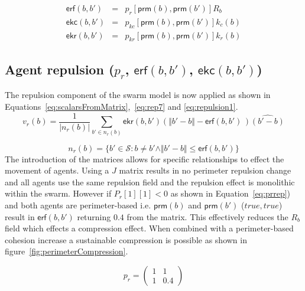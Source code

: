 \documentclass[12pt,a4paper]{IEEEtran}
\newcommand{\magn}[1]{\Vert{#1}\Vert}
\newcommand{\card}[1]{\vert{#1}\vert}
\newcommand{\vbb}[2]{#2-#1}
\begin{document}
\begin{equation}\label{eq:scalarsFromMatrix}
\begin{array}{rcl}
\mathsf{erf}(b, b') &=&  p_r[\mathsf{prm}(b), \mathsf{prm}(b')] R_b\\
\mathsf{ekc}(b, b') &=&  p_{kc}[\mathsf{prm}(b), \mathsf{prm}(b')] k_c(b) \\
\mathsf{ekr}(b, b') &=&  p_{kr}[\mathsf{prm}(b), \mathsf{prm}(b')] k_r(b)
\end{array}
\end{equation}

\subsection{Agent repulsion ($p_r$, $\mathsf{erf}(b,b')$, $\mathsf{ekc}(b,b')$)}

The repulsion component of the swarm model is now applied as shown in Equations~\ref{eq:scalarsFromMatrix},~\ref{eq:rep7} and \ref{eq:repulsion1}.
\small
\begin{equation}\label{eq:rep7}
	v_r(b) = \frac{1}{\card{n_r(b)}}\sum_{b' \in n_r(b)} \mathsf{ekr}(b,b') \left(\magn{\vbb{b}{b'}} - \mathsf{erf}\left(b,b'\right) \, \right) \widehat{\left(\vbb{b}{b'}\right)}
\end{equation}

\begin{equation}\label{eq:repulsion1}
n_r(b) = \{b' \in \mathcal{S} : b \neq b' \land \magn{\vbb{b}{b'}} \leq \mathsf{erf}(b,b')\}
\end{equation}
\normalsize
The introduction of the matrices allows for specific relationships to effect the movement of agents. Using a $J$ matrix results in no perimeter repulsion change and all agents use the same repulsion field and the repulsion effect is monolithic within the swarm. However if $P_r[1][1] < 0$ as shown in Equation~\ref{eq:prrep}) and both agents are perimeter-based i.e. $\mathsf{prm}(b)$ and $\mathsf{prm}(b')$ ($true,true$) result in $\mathsf{erf}(b, b')$ returning $0.4$ from the matrix. This effectively reduces the $R_b$ field which effects a compression effect. When combined with a perimeter-based cohesion increase a sustainable compression is possible as shown in figure~\ref{fig:perimeterCompression}.

\begin{equation}\label{eq:prrep}
	p_{r} = \left (
	\begin{array}{cc}
	1 & 1\\
	1 & 0.4
	\end{array} \right )
\end{equation}
\end{document}
